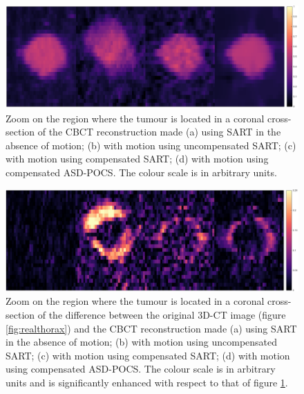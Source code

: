 \begin{figure}[H]
\begin{center} 
\includegraphics[width=1\linewidth]{MotionCorrection/tumourCC.png}
\hspace{0.1cm}{\footnotesize (a)}\hspace{3.2cm}{\footnotesize (b)}\hspace{3.2cm}{\footnotesize (c)}\hspace{3.2cm}{\footnotesize (d)} 
\caption{\label{fig:tumourCC}  Zoom on the region where the tumour is located in a coronal cross-section of the CBCT reconstruction made (a) using SART in the absence of motion; (b) with motion using uncompensated SART; (c) with motion using compensated SART; (d) with motion using compensated ASD-POCS.  The colour scale is in arbitrary units.} 
\end{center} 
\end{figure}

\begin{figure}[H]
\begin{center} 
\includegraphics[width=1\linewidth]{MotionCorrection/tumourCC_err.png}
\hspace{0.1cm}{\footnotesize (a)}\hspace{3.2cm}{\footnotesize (b)}\hspace{3.2cm}{\footnotesize (c)}\hspace{3.2cm}{\footnotesize (d)} 
\caption{\label{fig:tumourCC_err}  Zoom on the region where the tumour is located in a coronal cross-section of the difference  between the original 3D-CT image (figure \ref{fig:realthorax}) and the CBCT reconstruction made (a) using SART in the absence of motion; (b) with motion using uncompensated SART; (c) with motion using compensated SART; (d) with motion using compensated ASD-POCS.  The colour scale is in arbitrary units and is significantly enhanced with respect to that of figure \ref{fig:tumourCC}.} 
\end{center} 
\end{figure}


